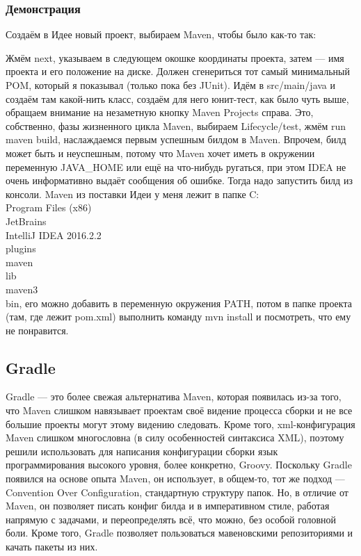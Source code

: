 \documentclass[a5paper]{article}
\begin{document}
\subsubsection{Демонстрация}

Создаём в Идее новый проект, выбираем Maven, чтобы было как-то так:

Жмём next, указываем в следующем окошке координаты проекта, затем --- имя проекта и его положение на диске. Должен сгенериться тот самый минимальный POM, который я показывал (только пока без JUnit). Идём в src/main/java и создаём там какой-нить класс, создаём для него юнит-тест, как было чуть выше, обращаем внимание на незаметную кнопку Maven Projects справа. Это, собственно, фазы жизненного цикла Maven, выбираем Lifecycle/test, жмём run maven build, наслаждаемся первым успешным билдом в Maven. Впрочем, билд может быть и неуспешным, потому что Maven хочет иметь в окружении переменную JAVA\_HOME или ещё на что-нибудь ругаться, при этом IDEA не очень информативно выдаёт сообщения об ошибке. Тогда надо запустить билд из консоли. Maven из поставки Идеи у меня лежит в папке C:\\Program Files (x86)\\JetBrains\\IntelliJ IDEA 2016.2.2\\plugins\\maven\\lib\\maven3\\bin, его можно добавить в переменную окружения PATH, потом в папке проекта (там, где лежит pom.xml) выполнить команду mvn install и посмотреть, что ему не понравится.

\subsection{Gradle}

Gradle --- это более свежая альтернатива Maven, которая появилась из-за того, что Maven слишком навязывает проектам своё видение процесса сборки и не все большие проекты могут этому видению следовать. Кроме того, xml-конфигурация Maven слишком многословна (в силу особенностей синтаксиса XML), поэтому решили использовать для написания конфигурации сборки язык программирования высокого уровня, более конкретно, Groovy. Поскольку Gradle появился на основе опыта Maven, он использует, в общем-то, тот же подход --- Convention Over Configuration, стандартную структуру папок. Но, в отличие от Maven, он позволяет писать конфиг билда и в императивном стиле, работая напрямую с задачами, и переопределять всё, что можно, без особой головной боли. Кроме того, Gradle позволяет пользоваться мавеновскими репозиториями и качать пакеты из них.
\end{document}
